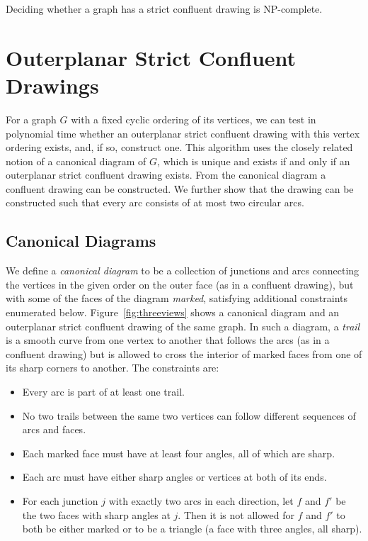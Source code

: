 \documentclass{llncs}
\begin{document}
\begin {theorem}
  Deciding whether a graph has a strict confluent drawing is NP-complete.
\end {theorem}

\section {Outerplanar Strict Confluent Drawings}


For a graph $G$ with a fixed cyclic ordering of its vertices, we can test in polynomial time whether an outerplanar strict confluent drawing with this vertex ordering exists, and, if so, construct one. This algorithm uses the closely related notion of a canonical diagram of $G$, which is unique and exists if and only if an outerplanar strict confluent drawing exists. From the canonical diagram a confluent drawing can be constructed. We further show that the drawing can be constructed such that every arc consists of at most two circular arcs. 



\subsection{Canonical Diagrams}

We define a \emph{canonical diagram} to be a collection of junctions and arcs connecting the vertices in the given order on the outer face (as in a confluent drawing), but with some of the faces of the diagram \emph{marked}, satisfying additional constraints enumerated below. Figure~\ref{fig:threeviews} shows a canonical diagram and an outerplanar strict confluent drawing of the same graph. In such a diagram, a \emph{trail} is a smooth curve from one vertex to another that follows the arcs (as in a confluent drawing) but is allowed to cross the interior of marked faces from one of its sharp corners to another. The constraints are:
\begin{itemize}
\item Every arc is part of at least one trail.
\item No two trails between the same two vertices can follow different sequences of arcs and faces.
\item Each marked face must have at least four angles, all of which are sharp.
\item Each arc must have either sharp angles or vertices at both of its ends.
\item For each junction $j$ with exactly two arcs in each direction, let $f$ and $f'$ be the two faces with sharp angles at $j$. Then it is not allowed for $f$ and $f'$ to both be either marked or to be a triangle (a face with three angles, all sharp).
\end{itemize}
\end{document}
